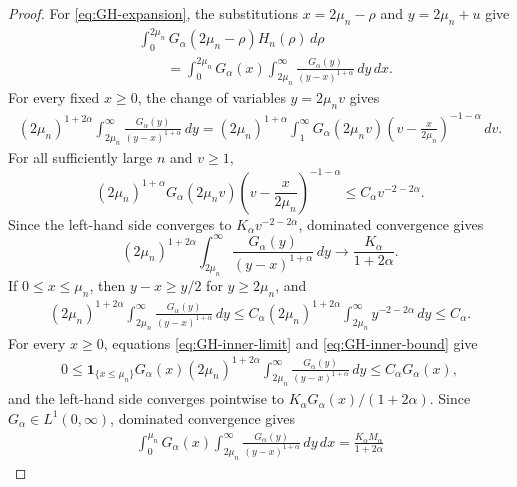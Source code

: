 \documentclass[11pt]{amsart}
\numberwithin{equation}{section}
\theoremstyle{remark}
\newcommand{\one}{\mathbf 1}
\begin{document}
\begin{proof}
For \eqref{eq:GH-expansion}, the substitutions
$x=2\mu_n-\rho$ and $y=2\mu_n+u$ give
\begin{equation}\label{eq:GH-double-integral}
 \begin{aligned}
 &\int_0^{2\mu_n}G_\alpha(2\mu_n-\rho)H_n(\rho)\,d\rho\\
 &\qquad=\int_0^{2\mu_n}G_\alpha(x)
 \int_{2\mu_n}^\infty
 \frac{G_\alpha(y)}{(y-x)^{1+\alpha}}\,dy\,dx.
 \end{aligned}
\end{equation}
For every fixed $x\ge0$, the change of variables $y=2\mu_nv$ gives
\[
 \begin{aligned}
 (2\mu_n)^{1+2\alpha}\int_{2\mu_n}^\infty
 \frac{G_\alpha(y)}{(y-x)^{1+\alpha}}\,dy=(2\mu_n)^{1+\alpha}\int_1^\infty
 G_\alpha(2\mu_nv)
 \left(v-\frac{x}{2\mu_n}\right)^{-1-\alpha}\,dv.
 \end{aligned}
\]
For all sufficiently large $n$ and $v\ge1$,
\[
 (2\mu_n)^{1+\alpha}G_\alpha(2\mu_nv)
 \left(v-\frac{x}{2\mu_n}\right)^{-1-\alpha}
 \le C_\alpha v^{-2-2\alpha}.
\]
Since the left-hand side converges to
$K_\alpha v^{-2-2\alpha}$, dominated convergence gives
\begin{equation}\label{eq:GH-inner-limit}
 (2\mu_n)^{1+2\alpha}\int_{2\mu_n}^\infty
 \frac{G_\alpha(y)}{(y-x)^{1+\alpha}}\,dy
 \longrightarrow\frac{K_\alpha}{1+2\alpha}.
\end{equation}
If $0\le x\le\mu_n$, then $y-x\ge y/2$ for $y\ge2\mu_n$, and
\begin{equation}\label{eq:GH-inner-bound}
 \begin{aligned}
 (2\mu_n)^{1+2\alpha}\int_{2\mu_n}^\infty
 \frac{G_\alpha(y)}{(y-x)^{1+\alpha}}\,dy\le C_\alpha(2\mu_n)^{1+2\alpha}
 \int_{2\mu_n}^\infty y^{-2-2\alpha}\,dy
 \le C_\alpha.
 \end{aligned}
\end{equation}
For every $x\ge0$, equations \eqref{eq:GH-inner-limit} and
\eqref{eq:GH-inner-bound} give
\[
 \begin{aligned}
 0\le\one_{\{x\le\mu_n\}}G_\alpha(x)(2\mu_n)^{1+2\alpha}
 \int_{2\mu_n}^\infty
 \frac{G_\alpha(y)}{(y-x)^{1+\alpha}}\,dy\le C_\alpha G_\alpha(x),
 \end{aligned}
\]
and the left-hand side converges pointwise to
$K_\alpha G_\alpha(x)/(1+2\alpha)$.  Since
$G_\alpha\in L^1(0,\infty)$, dominated convergence gives
\begin{equation}\label{eq:GH-main-range}
 \begin{aligned}
 \int_0^{\mu_n}G_\alpha(x)\int_{2\mu_n}^\infty
 \frac{G_\alpha(y)}{(y-x)^{1+\alpha}}\,dy\,dx=\frac{K_\alpha M_\alpha}{1+2\alpha}

\end{aligned}
\end{equation}
\end{proof}
\end{document}
